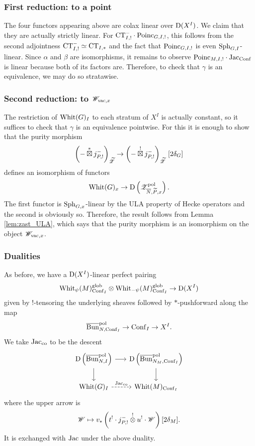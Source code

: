\subsubsection{First reduction: to a point} The four functors appearing above are colax linear over $\mathrm{D}(X^I)$. We claim that they are actually strictly linear. For $\mathrm{CT}_{I,!}^- \cdot \mathrm{Poinc}_{G,I,!}$, this follows from the second adjointness $\mathrm{CT}_{I,!}^- \simeq \mathrm{CT}_{I,*}$ and the fact that $\mathrm{Poinc}_{G,I,!}$ is even $\mathrm{Sph}_{G,I}$-linear. Since $\alpha$ and $\beta$ are isomorphisms, it remains to observe $\mathrm{Poinc}_{M,I,!} \cdot \mathrm{Jac}_{\mathrm{Conf}}$ is linear because both of its factors are. Therefore, to check that $\gamma$ is an equivalence, we may do so stratawise.

\subsubsection{Second reduction: to $\mathscr{W}_{\mathrm{vac}, x}$} The restriction of $\mathrm{Whit}(G)_I$ to each stratum of $X^I$ is actually constant, so it suffices to check that $\gamma$ is an equivalence pointwise. For this it is enough to show that the purity morphism
    \[
    \left( - \overset{*}{\boxtimes} j_{P,!}^- \right)_{\widetilde{\mathscr{Z}}} 
    \to \left( - \overset{!}{\boxtimes} j_{P,!}^- \right)_{\widetilde{\mathscr{Z}}} \, [2 \delta_{G}]
    \]
defines an isomorphism of functors
    \[
    \mathrm{Whit}(G)_x \to \mathrm{D}\left(\mathscr{Z}_{\overline{N},\widetilde{P},x}^{\mathrm{pol}} \right).
    \]
The first functor is $\mathrm{Sph}_{G,x}$-linear by the ULA property of Hecke operators and the second is obviously so. Therefore, the result follows from Lemma \ref{lem:zast_ULA}, which says that the purity morphism is an isomorphism on the object $\mathscr{W}_{\mathrm{vac}, x}$.

\subsubsection{Dualities} 

As before, we have a $\mathrm{D}(X^I)$-linear perfect pairing
\[
    \mathrm{Whit}_\psi(M)_{\mathrm{Conf}_I}^{\mathrm{glob}} \otimes \mathrm{Whit}_{-\psi}(M)_{\mathrm{Conf}_I}^{\mathrm{glob}} \to \mathrm{D}(X^I)
\]
given by $!$-tensoring the underlying sheaves followed by $*$-pushforward along the map
  \[\overline{\mathrm{Bun}}_{N, \mathrm{Conf}_I}^{\mathrm{pol}} \to \mathrm{Conf}_I \to X^I.\]
We take $\mathrm{Jac}_{\mathrm{co}}$ to be the descent
\[
\begin{tikzcd}[
  column sep={9em,between origins},
  row sep={4em,between origins}
]
    \DMod\left( \Bunc_{N,I}^\pol \right) \arrow[r] \arrow[d] & \DMod\left( \Bunc_{N_M, \Conf_I}^\pol \right) \arrow[d] \\
    \Whit(G)_I \arrow[r, dashed, "\Jac_\co"] & \Whit(M)_{\Conf_I} 
\end{tikzcd}
\]
where the upper arrow is
  \[\mathscr{W} \mapsto v_* \left( t^! \cdot j_{P,!}^- \overset{!}{\otimes} u^! \cdot \mathscr{W} \right)[2 \delta_{M}].\]
It is exchanged with $\mathrm{Jac}$ under the above duality.

